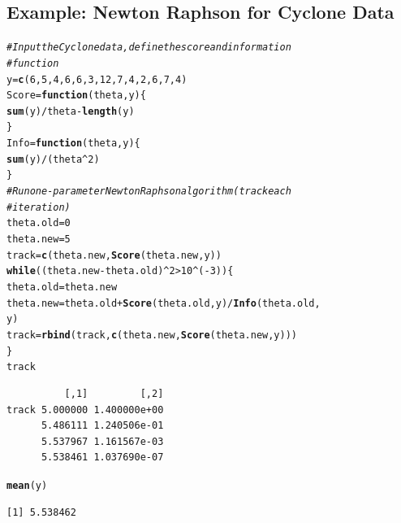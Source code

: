 \documentclass[oneside]{book}\usepackage[]{graphicx}\usepackage[svgnames]{xcolor}
\makeatletter
\newcommand{\hlnum}[1]{\textcolor[rgb]{0.686,0.059,0.569}{#1}}%
\newcommand{\hlcom}[1]{\textcolor[rgb]{0.678,0.584,0.686}{\textit{#1}}}%
\newcommand{\hlopt}[1]{\textcolor[rgb]{0,0,0}{#1}}%
\newcommand{\hlstd}[1]{\textcolor[rgb]{0.345,0.345,0.345}{#1}}%
\newcommand{\hlkwa}[1]{\textcolor[rgb]{0.161,0.373,0.58}{\textbf{#1}}}%
\newcommand{\hlkwb}[1]{\textcolor[rgb]{0.69,0.353,0.396}{#1}}%
\newcommand{\hlkwc}[1]{\textcolor[rgb]{0.333,0.667,0.333}{#1}}%
\newcommand{\hlkwd}[1]{\textcolor[rgb]{0.737,0.353,0.396}{\textbf{#1}}}%
\newenvironment{kframe}{%
 \def\at@end@of@kframe{}%
 \ifinner\ifhmode%
  \def\at@end@of@kframe{\end{minipage}}%
  \begin{minipage}{\columnwidth}%
 \fi\fi%
 \def\FrameCommand##1{\hskip\@totalleftmargin \hskip-\fboxsep
 \colorbox{shadecolor}{##1}\hskip-\fboxsep
     \hskip-\linewidth \hskip-\@totalleftmargin \hskip\columnwidth}%
 \MakeFramed {\advance\hsize-\width
   \@totalleftmargin\z@ \linewidth\hsize
   \@setminipage}}%
 {\par\unskip\endMakeFramed%
 \at@end@of@kframe}
\newenvironment{knitrout}{}{} %
\makeatother
\begin{document}
\subsection*{Example: Newton Raphson for Cyclone Data}
\begin{knitrout}
\color{fgcolor}\begin{kframe}
\begin{alltt}
\hlcom{# Input the Cyclone data, define the score and information}
\hlcom{# function}
\hlstd{y} \hlkwb{=} \hlkwd{c}\hlstd{(}\hlnum{6}\hlstd{,} \hlnum{5}\hlstd{,} \hlnum{4}\hlstd{,} \hlnum{6}\hlstd{,} \hlnum{6}\hlstd{,} \hlnum{3}\hlstd{,} \hlnum{12}\hlstd{,} \hlnum{7}\hlstd{,} \hlnum{4}\hlstd{,} \hlnum{2}\hlstd{,} \hlnum{6}\hlstd{,} \hlnum{7}\hlstd{,} \hlnum{4}\hlstd{)}
\hlstd{Score} \hlkwb{=} \hlkwa{function}\hlstd{(}\hlkwc{theta}\hlstd{,} \hlkwc{y}\hlstd{) \{}
  \hlkwd{sum}\hlstd{(y)}\hlopt{/}\hlstd{theta} \hlopt{-} \hlkwd{length}\hlstd{(y)}
\hlstd{\}}
\hlstd{Info} \hlkwb{=} \hlkwa{function}\hlstd{(}\hlkwc{theta}\hlstd{,} \hlkwc{y}\hlstd{) \{}
  \hlkwd{sum}\hlstd{(y)}\hlopt{/}\hlstd{(theta}\hlopt{^}\hlnum{2}\hlstd{)}
\hlstd{\}}
\hlcom{# Run one-parameter Newton Raphson algorithm (track each}
\hlcom{# iteration)}
\hlstd{theta.old} \hlkwb{=} \hlnum{0}
\hlstd{theta.new} \hlkwb{=} \hlnum{5}
\hlstd{track} \hlkwb{=} \hlkwd{c}\hlstd{(theta.new,} \hlkwd{Score}\hlstd{(theta.new, y))}
\hlkwa{while} \hlstd{((theta.new} \hlopt{-} \hlstd{theta.old)}\hlopt{^}\hlnum{2} \hlopt{>} \hlnum{10}\hlopt{^}\hlstd{(}\hlopt{-}\hlnum{3}\hlstd{)) \{}
  \hlstd{theta.old} \hlkwb{=} \hlstd{theta.new}
  \hlstd{theta.new} \hlkwb{=} \hlstd{theta.old} \hlopt{+} \hlkwd{Score}\hlstd{(theta.old, y)}\hlopt{/}\hlkwd{Info}\hlstd{(theta.old,}
    \hlstd{y)}
  \hlstd{track} \hlkwb{=} \hlkwd{rbind}\hlstd{(track,} \hlkwd{c}\hlstd{(theta.new,} \hlkwd{Score}\hlstd{(theta.new, y)))}
\hlstd{\}}
\hlstd{track}
\end{alltt}
\begin{verbatim}
          [,1]         [,2]
track 5.000000 1.400000e+00
      5.486111 1.240506e-01
      5.537967 1.161567e-03
      5.538461 1.037690e-07
\end{verbatim}
\begin{alltt}
\hlkwd{mean}\hlstd{(y)}
\end{alltt}
\begin{verbatim}
[1] 5.538462
\end{verbatim}
\end{kframe}
\end{knitrout}
\end{document}
